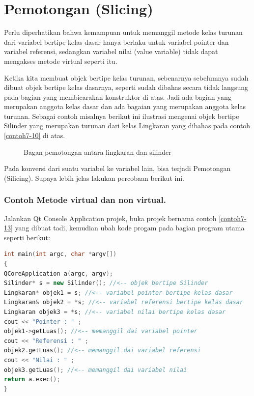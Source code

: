\section{Pemotongan (Slicing)}\label{pemotongan-slicing}

Perlu diperhatikan bahwa kemampuan untuk memanggil metode kelas turunan
dari variabel bertipe kelas dasar hanya berlaku untuk variabel pointer
dan variabel referensi, sedangkan variabel nilai (value variable) tidak
dapat mengakses metode virtual seperti itu.

Ketika kita membuat objek bertipe kelas turunan, sebenarnya sebelumnya
sudah dibuat objek bertipe kelas dasarnya, seperti sudah dibahas secara
tidak langsung pada bagian yang membicarakan konstruktor di atas. Jadi
ada bagian yang merupakan anggota kelas dasar dan ada bagaian yang
merupakan anggota kelas turunan. Sebagai contoh misalnya berikut ini
ilustrasi mengenai objek bertipe Silinder yang merupakan turunan dari
kelas Lingkaran yang dibahas pada contoh \ref{contoh7-10} di atas.

\begin{figure}[htbp]
\centering
{}
\caption{Bagan pemotongan antara lingkaran dan silinder}
\end{figure}

Pada konversi dari suatu variabel ke variabel lain, bisa terjadi
Pemotongan (Silicing). Supaya lebih jelas lakukan percobaan berikut ini.

\subsubsection*{Contoh  Metode virtual dan non virtual.}

Jalankan Qt Console Application projek, buka projek bernama contoh \ref{contoh7-13}
yang dibuat tadi, kemudian ubah kode progam pada bagian program utama
seperti berikut:



\begin{lstlisting}[language=c++, caption=Metode virtual dan non virtual, label=contoh7-13]
int main(int argc, char *argv[])
{
QCoreApplication a(argc, argv);
Silinder* s = new Silinder(); //<-- objek bertipe Silinder
Lingkaran* objek1 = s; //<-- variabel pointer bertipe kelas dasar
Lingkaran& objek2 = *s; //<-- variabel referensi bertipe kelas dasar
Lingkaran objek3 = *s; //<-- variabel nilai bertipe kelas dasar
cout << "Pointer : " ;
objek1->getLuas(); //<-- memanggil dai variabel pointer
cout << "Referensi : " ;
objek2.getLuas(); //<-- memanggil dai variabel referensi
cout << "Nilai : " ;
objek3.getLuas(); //<-- memanggil dai variabel nilai
return a.exec();
}
\end{lstlisting}

